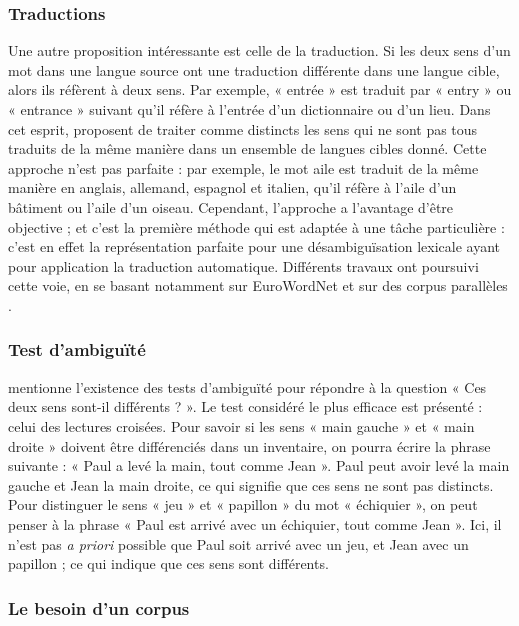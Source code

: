 \subsubsection{Traductions}

Une autre proposition intéressante est celle de la traduction. Si les deux sens
d'un mot dans une langue source ont une traduction différente dans une langue
cible, alors ils réfèrent à deux sens. Par exemple, « entrée » est traduit par
« entry » ou « entrance » suivant qu'il réfère à l'entrée d'un dictionnaire ou
d'un lieu. Dans cet esprit, \cite{resnik1997perspective} proposent de traiter
comme distincts les sens qui ne sont pas tous traduits de la même manière dans
un ensemble de langues cibles donné. Cette approche n'est pas parfaite : par
exemple, le mot aile est traduit de la même manière en anglais, allemand,
espagnol et italien, qu'il réfère à l'aile d'un bâtiment ou l'aile d'un oiseau.
Cependant, l'approche a l'avantage d'être objective ; et c'est la première
méthode qui est adaptée à une tâche particulière : c'est en effet la
représentation parfaite pour une désambiguïsation lexicale ayant pour
application la traduction automatique. Différents travaux ont poursuivi cette
voie, en se basant notamment sur EuroWordNet \citep{tufis2006from} et sur des
corpus parallèles \citep{chan2007nus,zhong2009word,plas2011automatic}.

\subsubsection{Test d'ambiguïté}

\cite{kilgarriff1997don} mentionne l'existence des tests d'ambiguïté pour
répondre à la question « Ces deux sens sont-il différents ? ». Le test
considéré le plus efficace est présenté : celui des lectures croisées. Pour
savoir si les sens « main gauche » et « main droite » doivent être différenciés
dans un inventaire, on pourra écrire la phrase suivante : « Paul a levé la
main, tout comme Jean ». Paul peut avoir levé la main gauche et Jean la main
droite, ce qui signifie que ces sens ne sont pas distincts. Pour distinguer le
sens « jeu » et « papillon » du mot « échiquier », on peut penser à la phrase «
Paul est arrivé avec un échiquier, tout comme Jean ». Ici, il n'est pas
\textit{a priori} possible que Paul soit arrivé avec un jeu, et Jean avec un
papillon ; ce qui indique que ces sens sont différents.

\subsubsection{Le besoin d'un corpus}
\label{besoincorpus}

